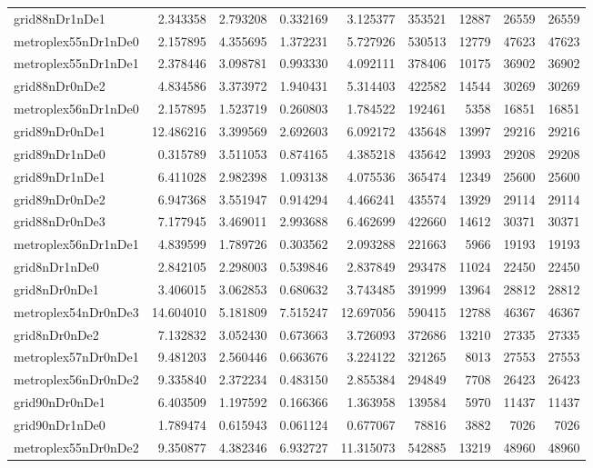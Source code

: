 \begin{longtable}{|l|r|r|r|r|r|r|r|r|}
grid88nDr1nDe1 & 2.343358 & 2.793208 & 0.332169 & 3.125377 & 353521 & 12887 & 26559 & 26559 \\
metroplex55nDr1nDe0 & 2.157895 & 4.355695 & 1.372231 & 5.727926 & 530513 & 12779 & 47623 & 47623 \\
metroplex55nDr1nDe1 & 2.378446 & 3.098781 & 0.993330 & 4.092111 & 378406 & 10175 & 36902 & 36902 \\
grid88nDr0nDe2 & 4.834586 & 3.373972 & 1.940431 & 5.314403 & 422582 & 14544 & 30269 & 30269 \\
metroplex56nDr1nDe0 & 2.157895 & 1.523719 & 0.260803 & 1.784522 & 192461 & 5358 & 16851 & 16851 \\
grid89nDr0nDe1 & 12.486216 & 3.399569 & 2.692603 & 6.092172 & 435648 & 13997 & 29216 & 29216 \\
grid89nDr1nDe0 & 0.315789 & 3.511053 & 0.874165 & 4.385218 & 435642 & 13993 & 29208 & 29208 \\
grid89nDr1nDe1 & 6.411028 & 2.982398 & 1.093138 & 4.075536 & 365474 & 12349 & 25600 & 25600 \\
grid89nDr0nDe2 & 6.947368 & 3.551947 & 0.914294 & 4.466241 & 435574 & 13929 & 29114 & 29114 \\
grid88nDr0nDe3 & 7.177945 & 3.469011 & 2.993688 & 6.462699 & 422660 & 14612 & 30371 & 30371 \\
metroplex56nDr1nDe1 & 4.839599 & 1.789726 & 0.303562 & 2.093288 & 221663 & 5966 & 19193 & 19193 \\
grid8nDr1nDe0 & 2.842105 & 2.298003 & 0.539846 & 2.837849 & 293478 & 11024 & 22450 & 22450 \\
grid8nDr0nDe1 & 3.406015 & 3.062853 & 0.680632 & 3.743485 & 391999 & 13964 & 28812 & 28812 \\
metroplex54nDr0nDe3 & 14.604010 & 5.181809 & 7.515247 & 12.697056 & 590415 & 12788 & 46367 & 46367 \\
grid8nDr0nDe2 & 7.132832 & 3.052430 & 0.673663 & 3.726093 & 372686 & 13210 & 27335 & 27335 \\
metroplex57nDr0nDe1 & 9.481203 & 2.560446 & 0.663676 & 3.224122 & 321265 & 8013 & 27553 & 27553 \\
metroplex56nDr0nDe2 & 9.335840 & 2.372234 & 0.483150 & 2.855384 & 294849 & 7708 & 26423 & 26423 \\
grid90nDr0nDe1 & 6.403509 & 1.197592 & 0.166366 & 1.363958 & 139584 & 5970 & 11437 & 11437 \\
grid90nDr1nDe0 & 1.789474 & 0.615943 & 0.061124 & 0.677067 & 78816 & 3882 & 7026 & 7026 \\
metroplex55nDr0nDe2 & 9.350877 & 4.382346 & 6.932727 & 11.315073 & 542885 & 13219 & 48960 & 48960 \\

\end{longtable}
